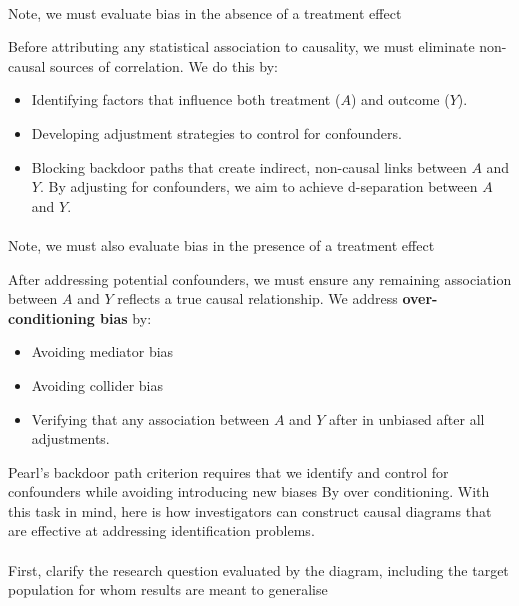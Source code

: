 \documentclass[
  singlecolumn]{article}
\makeatletter
\let\oldparagraph\paragraph
\renewcommand{\paragraph}{
    \@ifstar
      \xxxParagraphStar
      \xxxParagraphNoStar
  }
\newcommand{\xxxParagraphStar}[1]{\oldparagraph*{#1}\mbox{}}
\newcommand{\xxxParagraphNoStar}[1]{\oldparagraph{#1}\mbox{}}
\providecommand{\tightlist}{%
  \setlength{\itemsep}{0pt}\setlength{\parskip}{0pt}}\usepackage{longtable,booktabs,array}
\makeatother
\begin{document}
\paragraph{Note, we must evaluate bias in the absence of a treatment
effect}\label{note-we-must-evaluate-bias-in-the-absence-of-a-treatment-effect}

Before attributing any statistical association to causality, we must
eliminate non-causal sources of correlation. We do this by:

\begin{itemize}
\tightlist
\item
  Identifying factors that influence both treatment (\(A\)) and outcome
  (\(Y\)).
\item
  Developing adjustment strategies to control for confounders.
\item
  Blocking backdoor paths that create indirect, non-causal links between
  \(A\) and \(Y\). By adjusting for confounders, we aim to achieve
  d-separation between \(A\) and \(Y\).
\end{itemize}

\paragraph{Note, we must also evaluate bias in the presence of a
treatment
effect}\label{note-we-must-also-evaluate-bias-in-the-presence-of-a-treatment-effect}

After addressing potential confounders, we must ensure any remaining
association between \(A\) and \(Y\) reflects a true causal relationship.
We address \textbf{over-conditioning bias} by:

\begin{itemize}
\tightlist
\item
  Avoiding mediator bias
\item
  Avoiding collider bias
\item
  Verifying that any association between \(A\) and \(Y\) after in
  unbiased after all adjustments.
\end{itemize}

Pearl's backdoor path criterion requires that we identify and control
for confounders while avoiding introducing new biases By over
conditioning. With this task in mind, here is how investigators can
construct causal diagrams that are effective at addressing
identification problems.

\paragraph{First, clarify the research question evaluated by the
diagram, including the target population for whom results are meant to
generalise}\label{first-clarify-the-research-question-evaluated-by-the-diagram-including-the-target-population-for-whom-results-are-meant-to-generalise}
\end{document}
